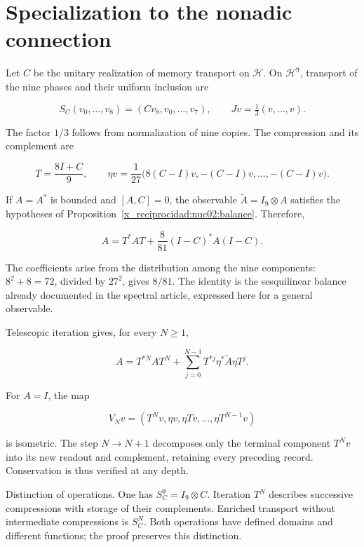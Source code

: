 \section{Specialization to the nonadic connection}

Let \(C\) be the unitary realization of memory transport on \(\mathcal H\). On \(\mathcal H^9\), transport of the nine phases and their uniform inclusion are

\[
S_C(v_0,\ldots,v_8)=(Cv_8,v_0,\ldots,v_7),
\qquad Jv=\tfrac13(v,\ldots,v).
\]

The factor \(1/3\) follows from normalization of nine copies. The compression and its complement are

\[
T=\frac{8I+C}{9},\qquad
\eta v=\frac1{27}\bigl(8(C-I)v,-(C-I)v,\ldots,-(C-I)v\bigr).
\]

If \(A=A^*\) is bounded and \([A,C]=0\), the observable \(\widetilde A=I_9\otimes A\) satisfies the hypotheses of Proposition~\ref{x_reciprocidad:nuc02:balance}. Therefore,

\begin{equation}
\boxed{A=T^*AT+\frac8{81}(I-C)^*A(I-C).}\label{x_reciprocidad:nuc02:eq:2}
\end{equation}

The coefficients arise from the distribution among the nine components: \(8^2+8=72\), divided by \(27^2\), gives \(8/81\). The identity is the sesquilinear balance already documented in the spectral article, expressed here for a general observable.

Telescopic iteration gives, for every \(N\geq1\),

\begin{equation}
A=T^{*N}AT^N+
\sum_{j=0}^{N-1}T^{*j}\eta^*\widetilde A\eta T^j.\label{x_reciprocidad:nuc02:eq:3}
\end{equation}

For \(A=I\), the map

\[
V_Nv=(T^Nv,\eta v,\eta Tv,\ldots,\eta T^{N-1}v)
\]

is isometric. The step \(N\to N+1\) decomposes only the terminal component \(T^Nv\) into its new readout and complement, retaining every preceding record. Conservation is thus verified at any depth.

Distinction of operations. One has \(S_C^9=I_9\otimes C\). Iteration \(T^N\) describes successive compressions with storage of their complements. Enriched transport without intermediate compressions is \(S_C^N\). Both operations have defined domains and different functions; the proof preserves this distinction.


